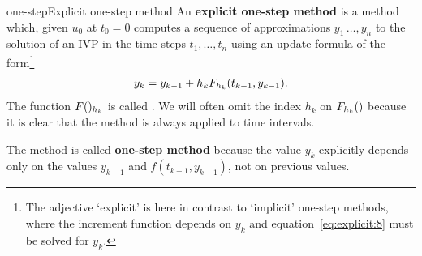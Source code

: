 \begin{Definition*}{one-step}{Explicit one-step method}
   An \textbf{explicit one-step
    method}  is a method which,
  given $u_0$ at $t_0 = 0$ computes a sequence of approximations
  $y_1\,\dots,y_n$ to the solution of an IVP in the time steps
  $t_1,\dots,t_n$ using an update formula of the form\footnote{The adjective
  `explicit' is here in contrast to `implicit'
  one-step methods, where the increment function depends 
	on $y_{k}$ and equation~\eqref{eq:explicit:8} must be solved
        for $y_{k}$.}
  \begin{gather}
    \label{eq:explicit:8}
    y_{k} = y_{k-1} + h_{k} F_{h_k}(t_{k-1},y_{k-1}).
  \end{gather}
  The function $F()_{h_k}$ is called .  We will often omit the index $h_k$ on
  $F_{h_k}()$ because it is clear that the method is always
  applied to time intervals.

  The method is called \textbf{one-step method}
  because the value $y_{k}$ explicitly depends only on the values
  $y_{k-1}$ and $f(t_{k-1}, y_{k-1})$, not on previous values.
\end{Definition*}

